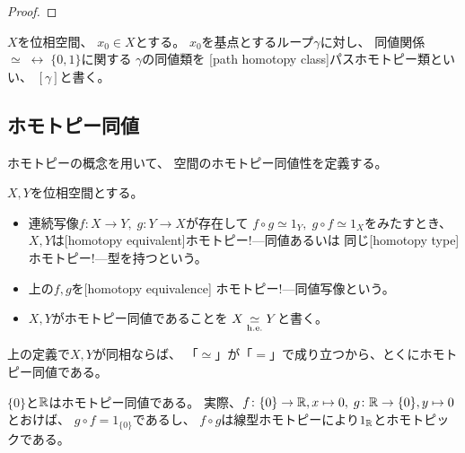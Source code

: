 \documentclass[report]{jlreq}
\begin{document}
\begin{proof}
\end{proof}

\begin{definition}[パスホモトピー類]
    $X$を位相空間、
    $x_0 \in X$とする。
    $x_0$を基点とするループ$\gamma$に対し、
    同値関係$\simeq \; \rel \; \{0, 1\}$に関する
    $\gamma$の同値類を
    [path homotopy class]{パスホモトピー類}といい、
    $[\gamma]$と書く。
\end{definition}



\subsection{ホモトピー同値}

ホモトピーの概念を用いて、
空間のホモトピー同値性を定義する。

\begin{definition}[ホモトピー同値]
    $X, Y$を位相空間とする。
    \begin{itemize}
        \item 連続写像$f \colon X \to Y,\; g \colon Y \to X$が存在して
            $f \circ g \simeq 1_Y,\; g \circ f \simeq 1_X$をみたすとき、
            $X, Y$は[homotopy equivalent]{ホモトピー!---同値}あるいは
            同じ[homotopy type]{ホモトピー!---型}を持つという。
        \item 上の$f, g$を[homotopy equivalence]
            {ホモトピー!---同値写像}という。
        \item $X, Y$がホモトピー同値であることを
            $X \simeqhe Y$と書く。
    \end{itemize}
\end{definition}

\begin{remark}[同相ならばホモトピー同値]
    上の定義で$X, Y$が同相ならば、
    「$\simeq$」が「$=$」で成り立つから、とくにホモトピー同値である。
\end{remark}

\begin{example}[ホモトピー同値な空間の例]
    $\{0\}$と$\mathbb{R}$はホモトピー同値である。
    実際、$f \colon \{0\} \to \mathbb{R}, x \mapsto 0,\; g \colon \mathbb{R} \to \{0\}, y \mapsto 0$とおけば、
    $g \circ f = 1_{\{0\}}$であるし、
    $f \circ g$は線型ホモトピーにより$1_{\mathbb{R}}$とホモトピックである。
\end{example}
\end{document}
